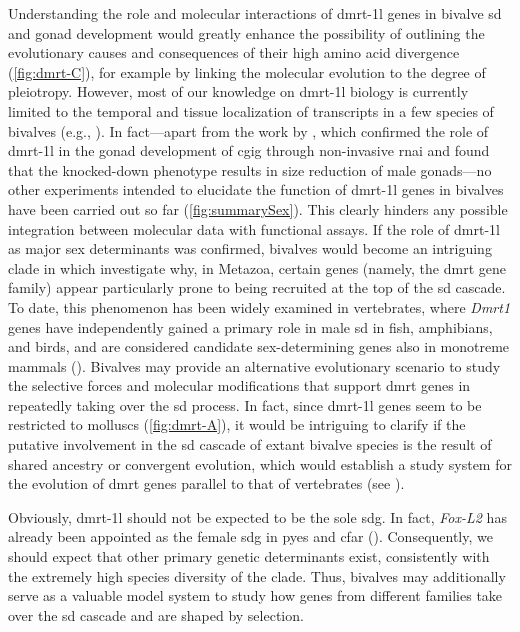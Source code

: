 Understanding the role and molecular interactions of \gls{dmrt-1l} genes in bivalve \gls{sd} and gonad development would greatly enhance the possibility of outlining the evolutionary causes and consequences of their high amino acid divergence (\cref{fig:dmrt-C}), for example by linking the molecular evolution to the degree of pleiotropy. However, most of our knowledge on \gls{dmrt-1l} biology is currently limited to the temporal and tissue localization of transcripts in a few species of bivalves (e.g., ). In fact---apart from the work by , which confirmed the role of \gls{dmrt-1l} in the gonad development of \gls{cgig} through non-invasive \gls{rnai} and found that the knocked-down phenotype results in size reduction of male gonads—no other experiments intended to elucidate the function of \gls{dmrt-1l} genes in bivalves have been carried out so far (\cref{fig:summarySex}). This clearly hinders any possible integration between molecular data with functional assays.
If the role of \gls{dmrt-1l} as major sex determinants was confirmed, bivalves would become an intriguing clade in which investigate why, in Metazoa, certain genes (namely, the \gls{dmrt} gene family) appear particularly prone to being recruited at the top of the \gls{sd} cascade. To date, this phenomenon has been widely examined in vertebrates, where \textit{Dmrt1} genes have independently gained a primary role in male \gls{sd} in fish, amphibians, and birds, and are considered candidate sex-determining genes also in monotreme mammals (). Bivalves may provide an alternative evolutionary scenario to study the selective forces and molecular modifications that support \gls{dmrt} genes in repeatedly taking over the \gls{sd} process. In fact, since \gls{dmrt-1l} genes seem to be restricted to molluscs (\cref{fig:dmrt-A}), it would be intriguing to clarify if the putative involvement in the \gls{sd} cascade of extant bivalve species is the result of shared ancestry or convergent evolution, which would establish a study system for the evolution of \gls{dmrt} genes parallel to that of vertebrates (see ).

Obviously, \gls{dmrt-1l} should not be expected to be the sole \gls{sdg}. In fact, \textit{Fox-L2} has already been appointed as the female \gls{sdg} in \gls{pyes} and \gls{cfar} (). Consequently, we should expect that other primary genetic determinants exist, consistently with the extremely high species diversity of the clade. Thus, bivalves may additionally serve as a valuable model system to study how genes from different families take over the \gls{sd} cascade and are shaped by selection.

